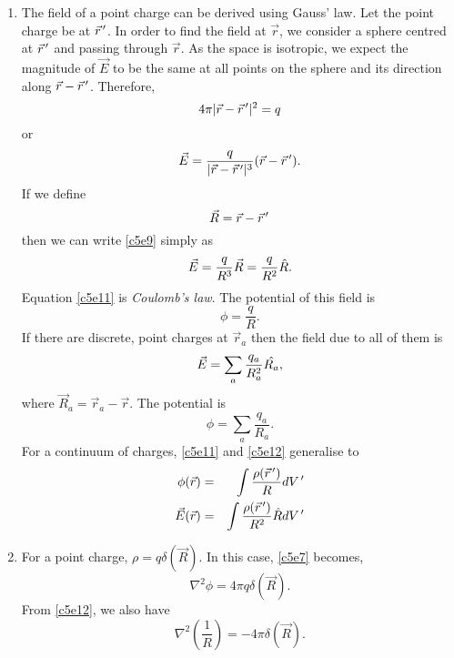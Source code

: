 \begin{enumerate}
\item The field of a point charge can be derived using Gauss' law. Let the point
charge be at $\vec{r}^{\,\prime}$. In order to find the field at $\vec{r}$, we consider
a sphere centred at $\vec{r}^{\,\prime}$ and passing through $\vec{r}$. As the space is
isotropic, we expect the magnitude of $\vec{E}$ to be the same at all points 
on the sphere and its direction along $\vec{r} - \vec{r}^{\,\prime}$. Therefore,
\[
4\pi |\vec{r} - \vec{r}^{\,\prime}|^2 = q
\]
or
\begin{equation}\label{c5e9}
\vec{E} = \frac{q}{|\vec{r} - \vec{r}^{\,\prime}|^3}(\vec{r} - \vec{r}^{\,\prime}).
\end{equation}
If we define
\begin{equation}\label{c5e10}
\vec{R} = \vec{r} - \vec{r}^{\,\prime}
\end{equation}
then we can write \eqref{c5e9} simply as
\begin{equation}\label{c5e11}
\vec{E} = \frac{q}{R^3}\vec{R} = \frac{q}{R^2}\hat{R}.
\end{equation}
Equation \eqref{c5e11} is \emph{Coulomb's law}. The potential of this field is
\begin{equation}\label{c5e12}
\phi = \frac{q}{R}.
\end{equation}
If there are discrete, point charges at $\vec{r}_a$ then the field due to all 
of them is
\begin{equation}\label{c5e13}
\vec{E} = \sum_a \frac{q_a}{R_a^2}\hat{R_a},
\end{equation}
where $\vec{R}_a = \vec{r}_a - \vec{r}$. The potential is
\begin{equation}\label{c5e14}
\phi = \sum_a\frac{q_a}{R_a}.
\end{equation}
For a continuum of charges, \eqref{c5e11} and \eqref{c5e12} generalise to
\begin{eqnarray}
\phi(\vec{r}) &=& \int\frac{\rho(\vec{r}^{\,\prime})}{R}dV^{\,\prime} \label{c5e15} \\
\vec{E}(\vec{r}) &=& \int\frac{\rho(\vec{r}^{\,\prime})}{R^2}\hat{R}dV^{\,\prime}\label{c5e16}
\end{eqnarray}

\item For a point charge, $\rho = q\delta(\vec{R})$. In this case, \eqref{c5e7}
becomes,
\[
\nabla^2\phi = 4\pi q\delta(\vec{R}).
\]
From \eqref{c5e12}, we also have
\begin{equation}\label{c5e17}
\nabla^2\left(\frac{1}{R}\right) = -4\pi\delta(\vec{R}).
\end{equation}


\end{enumerate}
